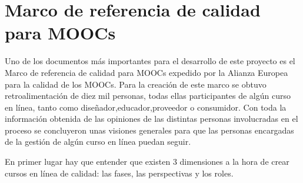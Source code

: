 \section{Marco de referencia de calidad para MOOCs}
Uno de los documentos más importantes para el desarrollo de este proyecto es el Marco de referencia de calidad para MOOCs\cite{quality-reference-framework} expedido por la Alianza Europea para la calidad de los MOOCs. Para la creación de este marco se obtuvo retroalimentación de diez mil personas, todas ellas participantes de algún curso en línea, tanto como diseñador,educador,proveedor o consumidor. Con toda la información obtenida de las opiniones de las distintas personas involucradas en el proceso se concluyeron unas visiones generales para que las personas encargadas de la gestión de algún curso en línea puedan seguir.

En primer lugar hay que entender que existen 3 dimensiones a la hora de crear cursos en línea de calidad: las fases, las perspectivas y los roles.


